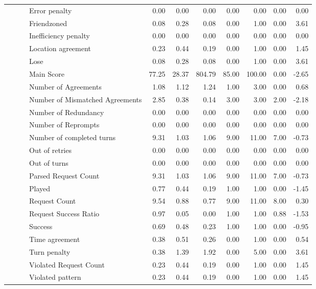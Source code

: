 \begin{tabular}{llllrrrrrrr}
 &  &  & Error penalty & 0.00 & 0.00 & 0.00 & 0.00 & 0.00 & 0.00 & 0.00 \\
 &  &  & Friendzoned & 0.08 & 0.28 & 0.08 & 0.00 & 1.00 & 0.00 & 3.61 \\
 &  &  & Inefficiency penalty & 0.00 & 0.00 & 0.00 & 0.00 & 0.00 & 0.00 & 0.00 \\
 &  &  & Location agreement & 0.23 & 0.44 & 0.19 & 0.00 & 1.00 & 0.00 & 1.45 \\
 &  &  & Lose & 0.08 & 0.28 & 0.08 & 0.00 & 1.00 & 0.00 & 3.61 \\
 &  &  & Main Score & 77.25 & 28.37 & 804.79 & 85.00 & 100.00 & 0.00 & -2.65 \\
 &  &  & Number of Agreements & 1.08 & 1.12 & 1.24 & 1.00 & 3.00 & 0.00 & 0.68 \\
 &  &  & Number of Mismatched Agreements & 2.85 & 0.38 & 0.14 & 3.00 & 3.00 & 2.00 & -2.18 \\
 &  &  & Number of Redundancy & 0.00 & 0.00 & 0.00 & 0.00 & 0.00 & 0.00 & 0.00 \\
 &  &  & Number of Reprompts & 0.00 & 0.00 & 0.00 & 0.00 & 0.00 & 0.00 & 0.00 \\
 &  &  & Number of completed turns & 9.31 & 1.03 & 1.06 & 9.00 & 11.00 & 7.00 & -0.73 \\
 &  &  & Out of retries & 0.00 & 0.00 & 0.00 & 0.00 & 0.00 & 0.00 & 0.00 \\
 &  &  & Out of turns & 0.00 & 0.00 & 0.00 & 0.00 & 0.00 & 0.00 & 0.00 \\
 &  &  & Parsed Request Count & 9.31 & 1.03 & 1.06 & 9.00 & 11.00 & 7.00 & -0.73 \\
 &  &  & Played & 0.77 & 0.44 & 0.19 & 1.00 & 1.00 & 0.00 & -1.45 \\
 &  &  & Request Count & 9.54 & 0.88 & 0.77 & 9.00 & 11.00 & 8.00 & 0.30 \\
 &  &  & Request Success Ratio & 0.97 & 0.05 & 0.00 & 1.00 & 1.00 & 0.88 & -1.53 \\
 &  &  & Success & 0.69 & 0.48 & 0.23 & 1.00 & 1.00 & 0.00 & -0.95 \\
 &  &  & Time agreement & 0.38 & 0.51 & 0.26 & 0.00 & 1.00 & 0.00 & 0.54 \\
 &  &  & Turn penalty & 0.38 & 1.39 & 1.92 & 0.00 & 5.00 & 0.00 & 3.61 \\
 &  &  & Violated Request Count & 0.23 & 0.44 & 0.19 & 0.00 & 1.00 & 0.00 & 1.45 \\
 &  &  & Violated pattern & 0.23 & 0.44 & 0.19 & 0.00 & 1.00 & 0.00 & 1.45 \\

\end{tabular}
